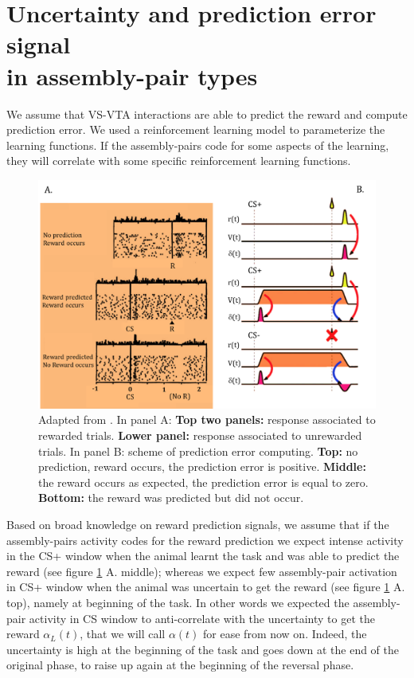\section{Uncertainty and prediction error signal\\in assembly-pair types}
\label{sec:CorrRL}
We assume that VS-VTA interactions are able to predict the reward and compute prediction error. We used a reinforcement learning model to parameterize the learning functions. If the assembly-pairs code for some aspects of the learning, they will correlate with some specific reinforcement learning functions.\\
\begin{figure}
    \centering
    \includegraphics[scale=0.35]{figures/RewardDoyaRLSUM.png}
    \caption{Adapted from \cite{Doya}. In panel A: \textbf{Top two panels:} response associated to rewarded trials. \textbf{Lower panel:} response associated to unrewarded trials. In panel B: scheme of prediction error computing. \textbf{Top:} no prediction, reward occurs, the prediction error is positive. \textbf{Middle:} the reward occurs as expected, the prediction error is equal to zero. \textbf{Bottom:} the reward was predicted but did not occur.}
    \label{fig:RewDoyaSum}
\end{figure}%
Based on broad knowledge on reward prediction signals, we assume that if the assembly-pairs activity codes for the reward prediction we expect intense activity in the CS+ window when the animal learnt the task and was able to predict the reward (see figure \ref{fig:RewDoyaSum} A. middle); whereas we expect few assembly-pair activation in CS+ window when the animal was uncertain to get the reward (see figure \ref{fig:RewDoyaSum} A. top), namely at beginning of the task. In other words we expected the assembly-pair activity in CS window to anti-correlate with the uncertainty to get the reward $\alpha_L(t)$, that we will call $\alpha(t)$ for ease from now on. Indeed, the uncertainty is high at the beginning of the task and goes down at the end of the original phase, to raise up again at the beginning of the reversal phase. 
